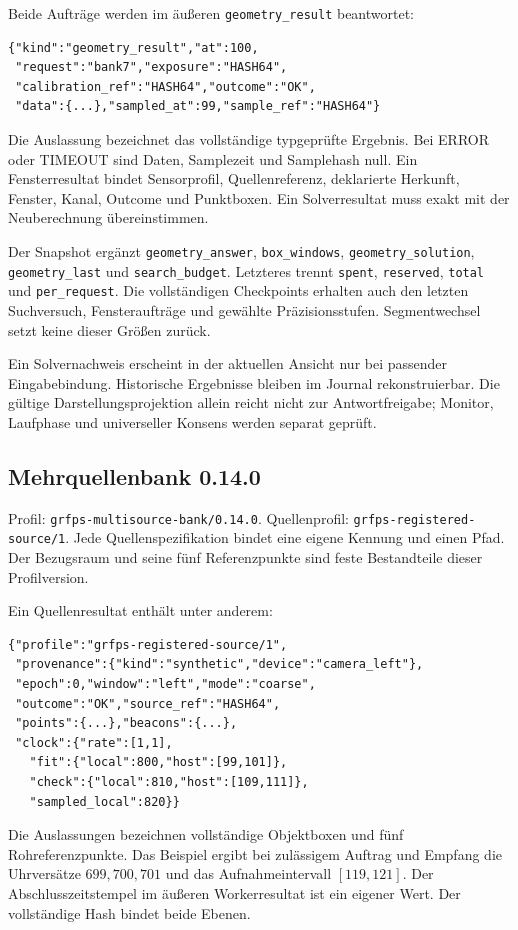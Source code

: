 \documentclass[11pt,a4paper]{article}
\begin{document}
Beide Aufträge werden im äußeren \texttt{geometry\_result}
beantwortet:
\begin{lstlisting}
{"kind":"geometry_result","at":100,
 "request":"bank7","exposure":"HASH64",
 "calibration_ref":"HASH64","outcome":"OK",
 "data":{...},"sampled_at":99,"sample_ref":"HASH64"}
\end{lstlisting}
Die Auslassung bezeichnet das vollständige typgeprüfte Ergebnis.
Bei ERROR oder TIMEOUT sind Daten, Samplezeit und Samplehash null.
Ein Fensterresultat bindet Sensorprofil, Quellenreferenz, deklarierte
Herkunft, Fenster, Kanal, Outcome und Punktboxen. Ein Solverresultat
muss exakt mit der Neuberechnung übereinstimmen.

Der Snapshot ergänzt \texttt{geometry\_answer},
\texttt{box\_windows}, \texttt{geometry\_solution},
\texttt{geometry\_last} und \texttt{search\_budget}.
Letzteres trennt \texttt{spent}, \texttt{reserved}, \texttt{total}
und \texttt{per\_request}. Die vollständigen Checkpoints erhalten
auch den letzten Suchversuch, Fensteraufträge und gewählte
Präzisionsstufen. Segmentwechsel setzt keine dieser Größen zurück.

Ein Solvernachweis erscheint in der aktuellen Ansicht nur bei
passender Eingabebindung. Historische
Ergebnisse bleiben im Journal rekonstruierbar. Die gültige
Darstellungsprojektion allein reicht nicht zur Antwortfreigabe;
Monitor, Laufphase und universeller Konsens werden separat geprüft.

\clearpage\subsection{Mehrquellenbank 0.14.0}
Profil: \texttt{grfps-multisource-bank/0.14.0}. Quellenprofil:
\texttt{grfps-registered-source/1}. Jede Quellenspezifikation bindet
eine eigene Kennung und einen Pfad. Der Bezugsraum und seine fünf
Referenzpunkte sind feste Bestandteile dieser Profilversion.

Ein Quellenresultat enthält unter anderem:
\begin{lstlisting}
{"profile":"grfps-registered-source/1",
 "provenance":{"kind":"synthetic","device":"camera_left"},
 "epoch":0,"window":"left","mode":"coarse",
 "outcome":"OK","source_ref":"HASH64",
 "points":{...},"beacons":{...},
 "clock":{"rate":[1,1],
   "fit":{"local":800,"host":[99,101]},
   "check":{"local":810,"host":[109,111]},
   "sampled_local":820}}
\end{lstlisting}
Die Auslassungen bezeichnen vollständige Objektboxen und fünf
Rohreferenzpunkte. Das Beispiel ergibt bei zulässigem Auftrag
und Empfang die Uhrversätze $699,700,701$ und das Aufnahmeintervall
$[119,121]$. Der Abschlusszeitstempel im äußeren Workerresultat
ist ein eigener Wert. Der vollständige Hash bindet beide Ebenen.
\end{document}
